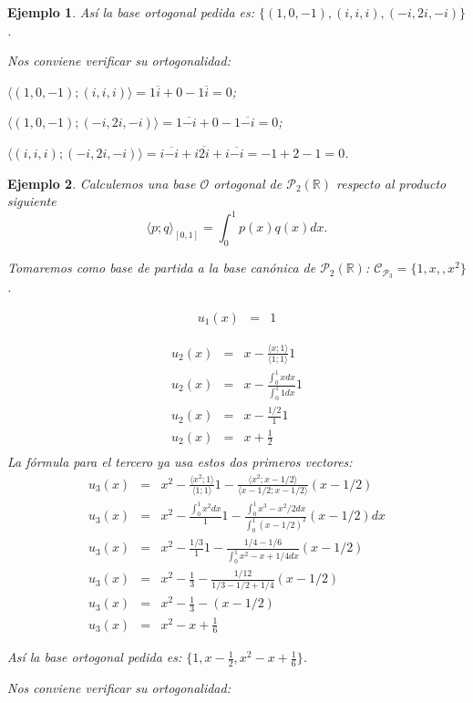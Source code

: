 \documentclass[12pt]{book}
\newtheorem{ejem}{Ejemplo}
\def\R{\mathbb{R}}
\def\P{\mathcal{P}}
\def\Ccal{\mathcal{C}}
\begin{document}
{\begin{ejem}
{Así la base ortogonal pedida es: $\{ (1,0,-1),(i,i,i),(-i,2i,-i)\}$.
 
Nos conviene verificar su ortogonalidad:

$\langle (1,0,-1);(i,i,i)\rangle=1\overline{i}+0-1\overline{i}=0$;

$\langle (1,0,-1);(-i,2i,-i)\rangle=1\overline{-i}+0-1\overline{-i}=0$;

$\langle (i,i,i);(-i,2i,-i)\rangle=i\overline{-i}+i\overline{2i}+i\overline{-i}=-1+2-1=0$.
}
\end{ejem}

\begin{ejem}
Calculemos una base $\mathcal{O}$ ortogonal de $\P_2(\R)$ respecto al producto siguiente
$$ \langle p;q\rangle_{[0,1]}=\int_0^1 p(x)q(x)dx.$$

{\em
Tomaremos como base de partida a la base canónica de $\P_2(\R)$: $\Ccal_{\P_3}=\{1,x,,x^2\}$.

\begin{eqnarray*}
u_1(x)&=& 1
\end{eqnarray*}

\begin{eqnarray*}
u_2(x)&=&x-\frac{\langle x;1\rangle}{\langle 1;1\rangle}1\\
u_2(x)&=&x-\frac{\int_0^1 x dx}{\int_0^1 1dx}1\\
u_2(x)&=&x-\frac{1/2}{1}1\\
u_2(x)&=&x+\frac{1}{2}\\
\end{eqnarray*}
La fórmula para el tercero ya usa estos dos primeros vectores:
\begin{eqnarray*}
u_3(x)&=&x^2-\frac{\langle x^2; 1\rangle}{\langle 1;1\rangle}1-\frac{\langle x^2; x-1/2\rangle}{\langle x-1/2;x-1/2\rangle}(x-1/2)\\
u_3(x)&=&x^2-\frac{\int_0^1 x^2dx}{1}1-\frac{\int_0^1x^3-x^2/2dx}{\int_0^1(x-1/2)^2}(x-1/2)dx\\
u_3(x)&=&x^2-\frac{1/3}{1}1-\frac{1/4-1/6}{\int_0^1 x^2-x+1/4dx}(x-1/2)\\
u_3(x)&=&x^2-\frac{1}{3}-\frac{1/12}{1/3-1/2+1/4}(x-1/2)\\
u_3(x)&=&x^2-\frac{1}{3}-(x-1/2)\\
u_3(x)&=&x^2-x+\frac{1}{6}
\end{eqnarray*}

Así la base ortogonal pedida es: $\{ 1,x-\frac{1}{2},x^2-x+\frac{1}{6}\}$.
 
Nos conviene verificar su ortogonalidad:

}
\end{ejem}}
\end{document}
